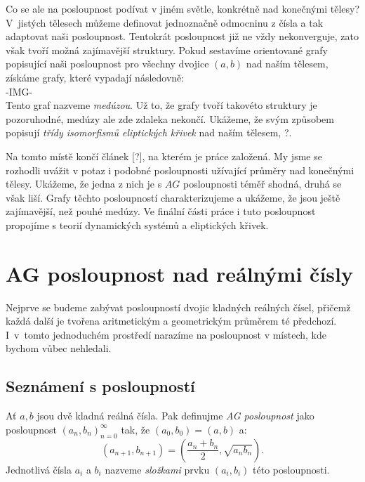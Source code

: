 \documentclass[12pt]{report}
\begin{document}
Co se ale na posloupnost podívat v jiném světle, konkrétně nad konečnými tělesy? V~jistých tělesech můžeme definovat jednoznačně  odmocninu z čísla a tak adaptovat naši posloupnost. Tentokrát posloupnost již ne vždy nekonverguje, zato však tvoří možná zajímavější struktury. Pokud sestavíme orientované grafy popisující naši posloupnost pro všechny dvojice $(a,b)$ nad naším tělesem, získáme grafy, které vypadají následovně:\\
-IMG-\\
Tento graf nazveme \textit{medúzou}. Už to, že grafy tvoří takovéto struktury je pozoruhodné, medúzy ale zde zdaleka nekončí. Ukážeme, že svým způsobem popisují \textit{třídy isomorfismů eliptických křivek} nad naším tělesem, ?. 

Na tomto místě končí článek [?], na kterém je práce založená. My jsme se rozhodli uvážit v potaz i podobné posloupnosti užívající průměry nad konečnými tělesy. Ukážeme, že jedna z nich je s $AG$ posloupnosti téměř shodná, druhá se však liší. Grafy těchto posloupností charakterizujeme a ukážeme, že jsou ještě zajímavější, než pouhé medúzy. Ve finální části práce i tuto posloupnost propojíme s teorií dynamických systémů a eliptických křivek.

\chapter{AG posloupnost nad reálnými čísly}


Nejprve se budeme zabývat posloupností dvojic kladných reálných čísel, přičemž každá další je tvořena aritmetickým a geometrickým průměrem té předchozí. I~v~tomto jednoduchém prostředí narazíme na posloupnost v místech, kde bychom vůbec nehledali.

\section{Seznámení s posloupností}


\begin{definice}
Ať $a,b$ jsou dvě kladná reálná čísla. Pak definujme \textit{AG posloupnost} jako posloupnost $(a_n,b_n)_{n=0}^{\infty}$ tak, že $(a_0,b_0) = (a,b)$ a:
$$\left(a_{n+1},b_{n+1} \right) = \left(\frac{a_n+b_n}{2}, \sqrt{a_n b_n} \right).$$
Jednotlivá čísla $a_i$ a $b_i$ nazveme \textit{složkami} prvku $(a_i,b_i)$ této posloupnosti.
\end{definice}
\end{document}
